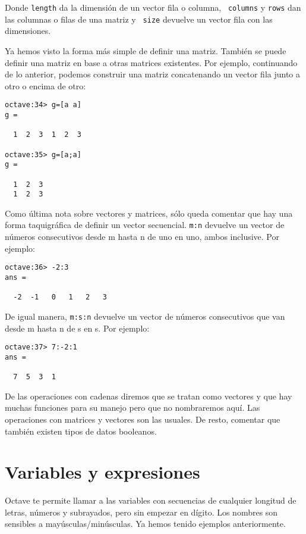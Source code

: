 Donde {\tt length}  da la dimensión de un vector  fila o columna, {\tt
columns} y {\tt  rows} dan las columnas  o filas de una  matriz y {\tt
size} devuelve un vector fila con las dimensiones.

Ya hemos visto  la forma más simple de definir  una matriz. También se
puede  definir una  matriz en  base a  otras matrices  existentes. Por
ejemplo,  continuando de  lo  anterior, podemos  construir una  matriz
concatenando un vector fila junto a otro o encima de otro:

\begin{verbatim}
octave:34> g=[a a]
g =

  1  2  3  1  2  3

octave:35> g=[a;a]
g =

  1  2  3
  1  2  3
\end{verbatim}

Como última  nota sobre vectores  y matrices, sólo queda  comentar que
hay una forma taquigráfica de  definir un vector secuencial. {\tt m:n}
devuelve un vector  de números consecutivos desde m hasta  n de uno en
uno, ambos inclusive. Por ejemplo:

\begin{verbatim}
octave:36> -2:3
ans =

  -2  -1   0   1   2   3
\end{verbatim}

De  igual   manera,  {\tt  m:s:n}   devuelve  un  vector   de  números
consecutivos que van desde m hasta n de s en s. Por ejemplo:

\begin{verbatim}
octave:37> 7:-2:1
ans =

  7  5  3  1
\end{verbatim}

De las operaciones  con cadenas diremos que se tratan  como vectores y
que hay muchas funciones para su  manejo pero que no nombraremos aquí.
Las operaciones  con matrices  y vectores son  las usuales.  De resto,
comentar que también existen tipos de datos booleanos.

\section{Variables y expresiones}
Octave te permite  llamar a las variables con  secuencias de cualquier
longitud de letras, números y  subrayados, pero sin empezar en dígito.
Los  nombres son  sensibles a  mayúsculas/minúsculas. Ya  hemos tenido
ejemplos anteriormente.

